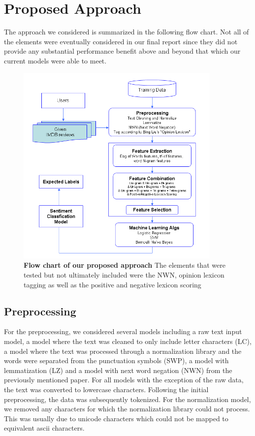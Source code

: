\documentclass{amsart}
\theoremstyle{definition}
\theoremstyle{remark}
\numberwithin{equation}{section}
\begin{document}
\section{Proposed Approach}
The approach we considered is summarized in the following flow chart.  Not all of the elements were eventually considered in our final report since they did not provide any substantial performance benefit above and beyond that which our current models were able to meet.
\begin{figure}
	\centering
	\includegraphics[width=10cm]{fig/flow_chart.png}
	\caption{\textbf{Flow chart of our proposed approach}  The elements that were tested but not ultimately included were the NWN, opinion lexicon tagging as well as the positive and negative lexicon scoring}
	\label{fig:flowchart}
\end{figure}
\subsection{Preprocessing}
For the preprocessing, we considered several models including a raw text input model, a model where the text was cleaned to only include letter characters (LC), a model where the text was processed through a normalization library and the words were separated from the punctuation symbols (SWP), a model with lemmatization (LZ) and a model with next word negation (NWN) from the previously mentioned paper.  For all models with the exception of the raw data, the text was converted to lowercase characters.  Following the initial preprocessing, the data was subsequently tokenized.  For the normalization model, we removed any characters for which the normalization library could not process.  This was usually due to unicode characters which could not be mapped to equivalent ascii characters.
\end{document}
